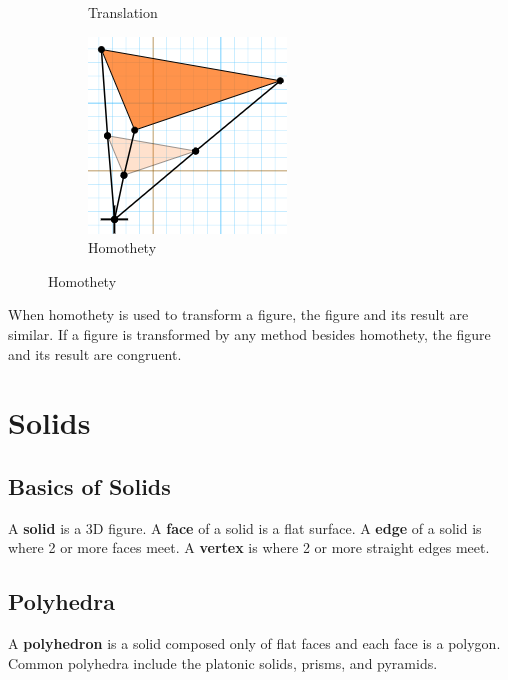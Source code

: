 \documentclass{article}
\begin{document}
\begin{figure} [hbt!]
\begin{subfigure}[b]{.45\linewidth}
                \caption*{Translation}
            \end{subfigure}
            \begin{subfigure}[b]{.45\linewidth}
                \includegraphics[scale=0.5]{Resources/Unit5Transformations/homothety.PNG}
                \caption*{Homothety}
            \end{subfigure}
        \end{figure}

        \noindent When homothety is used to transform a figure, the figure and its result are
        similar. If a figure is transformed by any method besides homothety, the figure and its
        result are congruent.

    \pagebreak

    \section{Solids}

        \subsection{Basics of Solids}
            A \textbf{solid} is a 3D figure. A \textbf{face} of a solid is a flat surface. A
            \textbf{edge} of a solid is where 2 or more faces meet. A \textbf{vertex} is where 2 or
            more straight edges meet. \\

        \subsection{Polyhedra}
            \noindent A \textbf{polyhedron} is a solid composed only of flat faces and each face is
            a polygon. Common polyhedra include the platonic solids, prisms, and pyramids. \\
\end{document}
